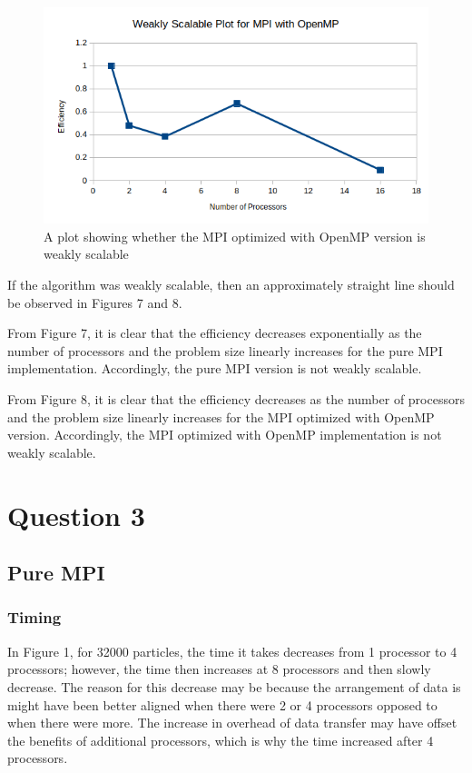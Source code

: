 \documentclass{article}
\begin{document}
\begin{figure}[H]
	\begin{center}
		\hspace*{-0.5cm}                                                           
  		\includegraphics[scale=0.8]{Report_Assets/weakscaleomp.png}
  	\end{center}
  	\caption{A plot showing whether the MPI optimized with OpenMP version is weakly scalable}
\end{figure}

If the algorithm was weakly scalable, then an approximately straight line should be observed in Figures 7 and 8. 

From Figure 7, it is clear that the efficiency decreases exponentially as the number of processors and the problem size linearly increases for the pure MPI implementation. Accordingly, the pure MPI version is not weakly scalable.

From Figure 8, it is clear that the efficiency decreases as the number of processors and the problem size linearly increases for the MPI optimized with OpenMP version. Accordingly, the MPI optimized with OpenMP implementation is not weakly scalable.

\newpage
\section{Question 3}
\subsection{Pure MPI}
\subsubsection{Timing}
In Figure 1, for 32000 particles, the time it takes decreases from 1 processor to 4 processors; however, the time then increases at 8 processors and then slowly decrease. The reason for this decrease may be because the arrangement of data is might have been better aligned when there were 2 or 4 processors opposed to when there were more. The increase in overhead of data transfer may have offset the benefits of additional processors, which is why the time increased after 4 processors.
\end{document}
